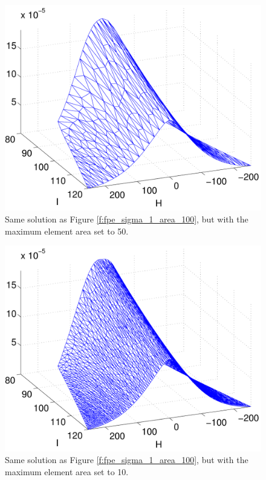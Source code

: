 \begin{figure}
\begin{center}
\includegraphics[width=\textwidth]{figures/fpe_solution_sigma_1_area_50}
\caption{Same solution as Figure \ref{f:fpe_sigma_1_area_100}, but with the maximum element area set to 50.}
\label{f:fpe_sigma_1_area_50}
\end{center}
\end{figure}

\begin{figure}
\begin{center}
\includegraphics[width=\textwidth]{figures/fpe_solution_sigma_1_area_10}
\caption{Same solution as Figure \ref{f:fpe_sigma_1_area_100}, but with the maximum element area set to 10.}
\label{f:fpe_sigma_1_area_10}
\end{center}
\end{figure}

